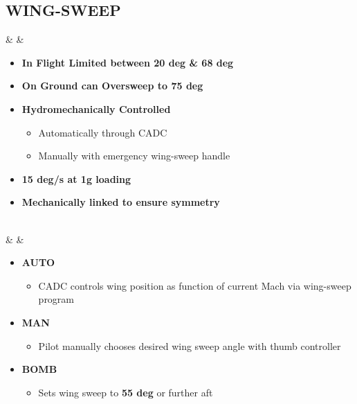 \documentclass[fontInter]{TechCheck}
\begin{document}
	\subsection{WING-SWEEP}
	\begin{listlongtable}
		\textbf{\textbullet} &  &
		\begin{minipage}[t]{\linewidth}
			\vspace{-7pt}
			\begin{itemize}
				\item \textbf{In Flight Limited between 20 deg \& 68 deg}
				\item \textbf{On Ground can Oversweep to 75 deg}
				\item \textbf{Hydromechanically Controlled}
				\begin{itemize}
					\item Automatically through CADC
					\item Manually with emergency wing-sweep handle
				\end{itemize}
				\item \textbf{15 deg/s at 1g loading}
				\item \textbf{Mechanically linked to ensure symmetry}
			\end{itemize}
		\end{minipage} \\
		\midrule
		\textbf{\textbullet} &  &
		\begin{minipage}[t]{\linewidth}
			\vspace{-7pt}
			\begin{itemize}
				\item \textbf{AUTO}
				\begin{itemize}
					\item CADC controls wing position as function of current Mach via wing-sweep program
				\end{itemize}
				\item \textbf{MAN}
				\begin{itemize}
					\item Pilot manually chooses desired wing sweep angle with thumb controller
				\end{itemize}
				\item \textbf{BOMB}
				\begin{itemize}
					\item Sets wing sweep to \textbf{55 deg} or further aft
				\end{itemize}
			\end{itemize}
		\end{minipage} \\

\end{listlongtable}
\end{document}
